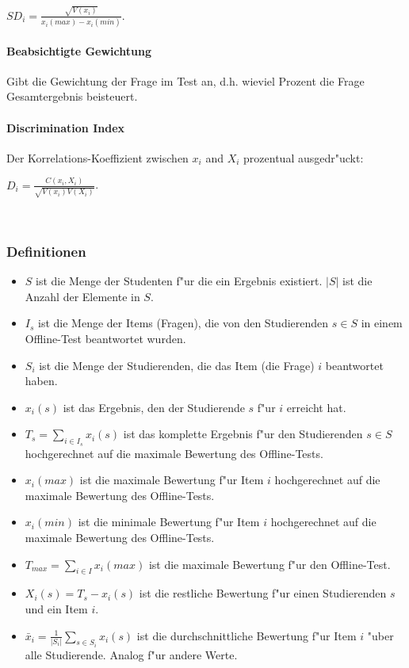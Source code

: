 \documentclass[12pt]{report}
\begin{document}
$SD_i = \frac{\sqrt{V(x_i)}}{x_i(max) - x_i(min)}$.

\paragraph{Beabsichtigte Gewichtung}
Gibt die Gewichtung der Frage im Test an, d.h. wieviel Prozent die Frage Gesamtergebnis beisteuert.


\paragraph{Discrimination Index}
Der Korrelations-Koeffizient zwischen $x_i$ and $X_i$ prozentual ausgedr"uckt:

$D_i= \frac{C(x_i, X_i)}{\sqrt{V(x_i)V(X_i)}}$.


\ \\

\subsubsection{Definitionen}
\label{subsubsec:definitions}
\begin{itemize}
\item $S$ ist die Menge der Studenten f"ur die ein Ergebnis existiert. $|S|$ ist die Anzahl der Elemente in $S$.
\item $I_s$ ist die Menge der Items (Fragen), die von den Studierenden $s\in S$ in einem Offline-Test beantwortet wurden.
\item $S_i$ ist die Menge der Studierenden, die das Item (die Frage) $i$ beantwortet haben.
\item $x_i(s)$ ist das Ergebnis, den der Studierende $s$ f"ur $i$ erreicht hat.
\item $T_s = \sum\limits_{i\in I_s} x_i(s)$ ist das komplette Ergebnis f"ur den Studierenden $s\in S$ hochgerechnet auf die maximale Bewertung des Offline-Tests.
\item $x_i(max)$ ist die maximale Bewertung f"ur Item $i$ hochgerechnet auf die maximale Bewertung des Offline-Tests. 
\item $x_i(min)$ ist die minimale Bewertung f"ur Item $i$ hochgerechnet auf die maximale Bewertung des Offline-Tests. 
\item $T_{max}=\sum\limits_{i\in I} x_i(max)$ ist die maximale Bewertung f"ur den Offline-Test.
\item $X_i(s) = T_s - x_i(s)$ ist die restliche Bewertung f"ur einen Studierenden $s$ und ein Item $i$.
\item $\bar{x}_i = \frac{1}{|S_i|}\sum\limits_{s\in S_i}x_i(s)$ ist die durchschnittliche Bewertung f"ur Item $i$ "uber alle Studierende. Analog f"ur andere Werte.
\end{itemize}
\end{document}
